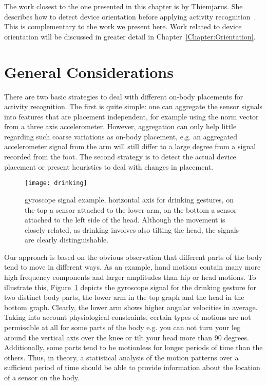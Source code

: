 The work closest to the one presented in this chapter is by
Thiemjarus. She describes how to detect device orientation before
applying activity recognition~\cite{Thiemjarus:2010p10602}.  This is
complementary to the work we present here. Work related to device
orientation will be discussed in greater detail in
Chapter~\ref{Chapter:Orientation}.

\section{General Considerations}
There are two basic strategies to deal with different on-body
placements for activity recognition. The first is quite simple: one
can aggregate the sensor signals into features that are placement
independent, for example using the norm vector from a three axis
accelerometer. However, aggregation can only help 
little regarding such coarse variations as on-body placement, e.g. an
aggregated accelerometer signal from the arm will still differ to a large degree
from a signal recorded from the foot. The second strategy is to detect
the actual device placement or present heuristics to deal with changes
in placement.

\begin{figure}[!t]
\centering
\texttt{[image: drinking]}
\caption[Body placement impact on a gyroscope]{gyroscope signal example, horizontal axis for drinking gestures,
  on the top a sensor attached to the lower arm, on the bottom a
  sensor attached to the left side of the head.  Although the movement
  is closely related, as drinking involves also tilting the head, the
  signals are clearly distinguishable.}
\label{fig:drinking}
\end{figure}

Our approach is based on the obvious observation that different parts
of the body tend to move in different ways. As an example, hand
motions contain many more high frequency components and larger
amplitudes than hip or head motions.  To illustrate this,
Figure~\ref{fig:drinking} depicts the gyroscope signal for the drinking
gesture for two distinct body parts, the lower arm in the top graph
and the head in the bottom graph. Clearly, the lower arm shows higher angular 
velocities in average.  Taking into account physiological
constraints, certain types of motions are not permissible at
all for some parts of the body e.g. you can not turn your leg around
the vertical axis over the knee or tilt your head more than 90 degrees.
Additionally, some parts tend to be motionless for longer periods of time than
the others. Thus, in theory, a statistical analysis of the motion
patterns over a sufficient period of time should be able to provide
information about the location of a sensor on the body.

